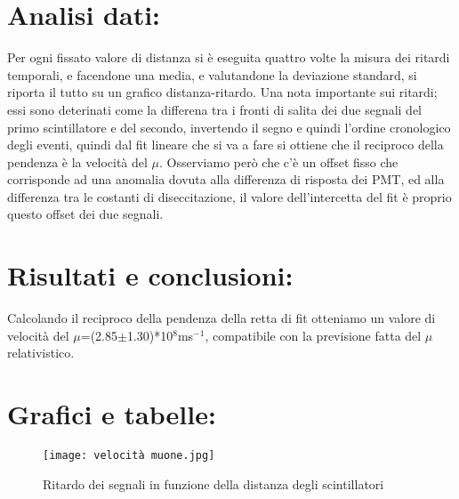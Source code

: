\documentclass{article}
\begin{document}
\section{Analisi dati:}
Per ogni fissato valore di distanza si è eseguita quattro volte la misura dei ritardi temporali, e facendone una media, e valutandone la deviazione standard, si riporta il tutto su un grafico distanza-ritardo. Una nota importante sui ritardi; essi sono deterinati come la differena tra i fronti di salita dei due segnali del primo scintillatore e del secondo, invertendo il segno e quindi l'ordine cronologico degli eventi, quindi dal fit lineare che si va a fare si ottiene che il reciproco della pendenza è la velocità del $\mu$. Osserviamo però che c'è un offset fisso che corrisponde ad una anomalia dovuta alla differenza di risposta dei PMT, ed alla differenza tra le costanti di diseccitazione, il valore dell'intercetta del fit è proprio questo offset dei due segnali.
~
\section{Risultati e conclusioni:}
Calcolando il reciproco della pendenza della retta di fit otteniamo un valore di velocità del $\mu$=(2.85$\pm$1.30)*10$^{8}$ms$^{-1}$, compatibile con la previsione fatta del $\mu$ relativistico.
~
\section{Grafici e tabelle:}
\begin{figure}[h!]
    \centering
    \texttt{[image: velocità muone.jpg]}
    \caption{Ritardo dei segnali in funzione della distanza degli scintillatori}
    \label{figura1}
\end{figure}
\end{document}
